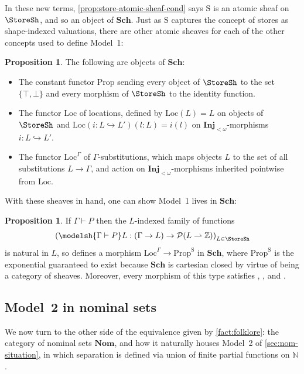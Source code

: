 \documentclass[
  sigconf,
  screen, ]{acmart}
\theoremstyle{definition}
\newtheorem{proposition}[theorem]{Proposition}
\newcommand\calP{\mathcal P}
\newcommand\N{\mathbb N}
\newcommand\Z{\mathbb Z}
\newcommand\nref[2]{\hyperref[#1]{#2}} \newcommand\checkhigh{{\huge{\color{red}\textbf{TODO: check}}}}
\newcommand\vtrue{\top}
\newcommand\vfalse{\bot}
\newcommand\FinInj{{\nref{def:FinInj}{\mathbf{Inj}_{<\omega}}}}
\newcommand\Store{{\nref{def:store}{\mathrm{S}}}}
\newcommand\Prop{{\nref{prop:ext-ren-inv-prop}{\mathrm{Prop}}}}
\newcommand\Loc{{\nref{prop:warp-in-the-atomic-sheaves}{\mathrm{Loc}}}}
\newcommand\Sch{{\nref{def:Sch}{\mathbf{Sch}}}}
\newcommand\Nom{{\nref{def:Nom}{\mathbf{Nom}}}}
\begin{document}
In these new terms,
\cref{prop:store-atomic-sheaf-cond} says
$\Store$ is an atomic sheaf on $\StoreSh$,
and so an object of $\Sch$.
Just as $\Store$ captures the concept of stores as shape-indexed valuations,
there are other atomic sheaves
for each of the other concepts used to define 
Model~1:

\begin{proposition} \label{prop:warp-in-the-atomic-sheaves} \label{prop:ext-ren-inv-prop}
  The following are objects of $\Sch$: \begin{itemize}[leftmargin=*]
    \item The constant functor $\Prop$
        sending every object of $\StoreSh$
        to the set $\{\vtrue,\vfalse\}$
        and every morphism of $\StoreSh$ to the identity function.
    \item The functor $\Loc$ of locations,
      defined by $\Loc(L) = L$
      on objects of $\StoreSh$
      and $\Loc(i : L\hookrightarrow L')(l : L) = i(l)$
      on $\FinInj$-morphisms $i : L\hookrightarrow L'$.
    \item The functor $\Loc^\Gamma$
      of $\Gamma$-substitutions,
      which maps objects $L$ to the set of all substitutions $L \rightarrow \Gamma$,
      and action on $\FinInj$-morphisms inherited pointwise from $\Loc$.
  \end{itemize}
\end{proposition}
With these sheaves in hand,
one can show Model~1 lives in $\Sch$:
\begin{proposition} \label{prop:model-one-lives-in-sch}
  If $\Gamma\vdash P$
  then the $L$-indexed family of functions
  \[
    \left(
    \modelsh{\Gamma\vdash P}L :
     (\Gamma\to L)
     \to
     \calP(L\rightharpoonup\Z)
    \right)_{L\in\StoreSh}
  \]
  is natural in $L$, so
  defines a morphism $\Loc^\Gamma\to \Prop^\Store$
  in $\Sch$,
  where $\Prop^\Store$ is the exponential guaranteed to exist
  because $\Sch$ is cartesian closed by virtue of being a category of sheaves.
  Moreover, every morphism of this type
  satisfies \Extension{}, \Renaming{}, and \Restriction{}.
\end{proposition}

\subsection{Model~2 in nominal sets} \label{sec:nominal-sets}

We now turn to the other side of the 
equivalence given by \cref{fact:folklore}:
the category of nominal sets $\Nom$,
and how it naturally houses
Model~2
of \cref{sec:nom-situation},
in which separation is defined via union of
finite partial functions on $\N$.
\end{document}
